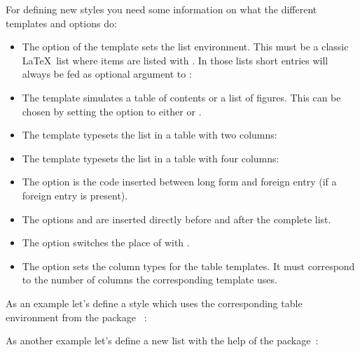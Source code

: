 \documentclass[load-preamble+]{cnltx-doc}
\begin{document}
For defining new styles you need some information on what the different
templates and options do:
\begin{itemize}
  \item The option  of the  template sets the list
    environment.  This must be a classic \LaTeX\ list where items are listed
    with .  In those lists short entries will always be fed as
    optional argument to : \\
  \item The template  simulates a table of contents or a list of
    figures.  This can be chosen by setting the option  to either
     or .
  \item The template  typesets the list in a table with two
    columns: \\
  \item The template  typesets the list in a table with four
    columns: \\
  \item The option  is the code inserted between long form
    and foreign entry (if a foreign entry is present).
  \item The options  and  are inserted directly
    before and after the complete list.
  \item The option  switches the place of  with
    .
  \item The option  sets the column types for the table
    templates.  It must correspond to the number of columns the corresponding
    template uses.
\end{itemize}

As an example let's define a style  which uses the corresponding
table environment from the package ~\cite{pkg:tabu}:

\begin{sourcecode}
  \usepackage{tabu,longtable}
\end{sourcecode}

As another example let's define a new list with the help of the 
package~\cite{pkg:enumitem}:
\end{document}
